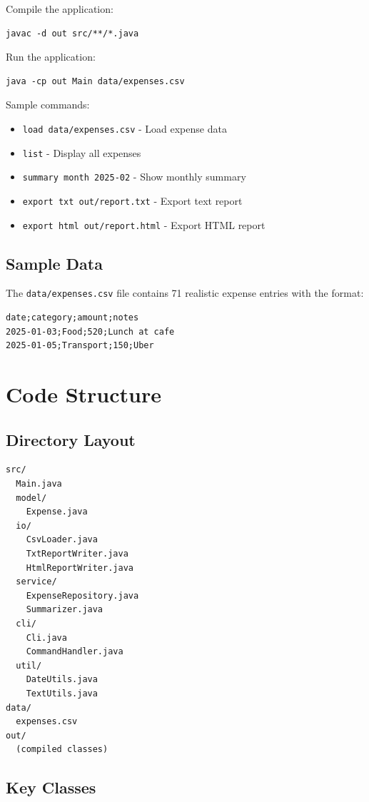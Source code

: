 \documentclass[10pt]{article}
\begin{document}
Compile the application:
\begin{verbatim}
javac -d out src/**/*.java
\end{verbatim}

Run the application:
\begin{verbatim}
java -cp out Main data/expenses.csv
\end{verbatim}

Sample commands:
\begin{itemize}
  \item \texttt{load data/expenses.csv} - Load expense data
  \item \texttt{list} - Display all expenses
  \item \texttt{summary month 2025-02} - Show monthly summary
  \item \texttt{export txt out/report.txt} - Export text report
  \item \texttt{export html out/report.html} - Export HTML report
\end{itemize}

\subsection{Sample Data}

The \texttt{data/expenses.csv} file contains 71 realistic expense entries with the format:
\begin{verbatim}
date;category;amount;notes
2025-01-03;Food;520;Lunch at cafe
2025-01-05;Transport;150;Uber
\end{verbatim}

\section{Code Structure}

\subsection{Directory Layout}

\begin{verbatim}
src/
  Main.java
  model/
    Expense.java
  io/
    CsvLoader.java
    TxtReportWriter.java
    HtmlReportWriter.java
  service/
    ExpenseRepository.java
    Summarizer.java
  cli/
    Cli.java
    CommandHandler.java
  util/
    DateUtils.java
    TextUtils.java
data/
  expenses.csv
out/
  (compiled classes)
\end{verbatim}

\subsection{Key Classes}
\end{document}
